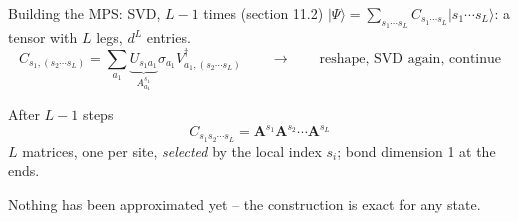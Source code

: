 \documentclass[aspectratio=169,10pt]{beamer}
\newcommand{\ket}[1]{\vert #1\rangle}
\newcommand{\Amat}[1]{\bm{A}^{#1}}
\begin{document}
\begin{frame}{Building the MPS: SVD, $L-1$ times (section 11.2)}
  $\ket\Psi=\sum_{s_1\cdots s_L}C_{s_1\cdots s_L}\ket{s_1\cdots s_L}$: a tensor with $L$ legs, $d^L$ entries.
  \[
    C_{s_1,(s_2\cdots s_L)}
    =\sum_{a_1}\underbrace{U_{s_1a_1}}_{A^{s_1}_{a_1}}\sigma_{a_1}V^{\dagger}_{a_1,(s_2\cdots s_L)}
    \qquad\longrightarrow\qquad
    \text{reshape, SVD again, continue}
  \]
  \begin{block}{After $L-1$ steps}
    \[
      C_{s_1s_2\cdots s_L}=\Amat{s_1}\Amat{s_2}\cdots\Amat{s_L}
    \]
    $L$ matrices, one per site, \emph{selected} by the local index $s_i$; bond dimension 1 at the ends.
  \end{block}
  \begin{center}
  \end{center}
  \centering\alert{Nothing has been approximated yet} -- the construction is exact for any state.
\end{frame}
\end{document}
